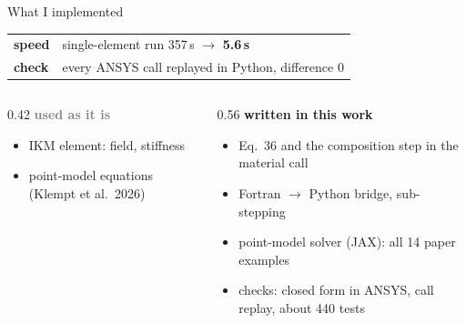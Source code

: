 \documentclass[aspectratio=169,11pt]{beamer}
\begin{document}
\begin{frame}{What I implemented}
\centering
{}

\vspace{10pt}
\begin{tabular}{@{}ll@{}}
\textbf{speed} & single-element run 357\,s $\to$ \textbf{5.6\,s}\\
\textbf{check} & every ANSYS call replayed in Python, difference 0\\
\end{tabular}

\vspace{6pt}
\begin{columns}[T]
\begin{column}{0.42\textwidth}\footnotesize
\textcolor{gray}{\textbf{used as it is}}
\begin{itemize}
  \item IKM element: field, stiffness
  \item point-model equations (Klempt et al.\ 2026)
\end{itemize}
\end{column}
\begin{column}{0.56\textwidth}\footnotesize
\textcolor{c3}{\textbf{written in this work}}
\begin{itemize}
  \item Eq.\ 36 and the composition step in the material call
  \item Fortran $\to$ Python bridge, sub-stepping
  \item point-model solver (JAX): all 14 paper examples
  \item checks: closed form in ANSYS, call replay, about 440 tests
\end{itemize}
\end{column}
\end{columns}
\end{frame}
\end{document}
